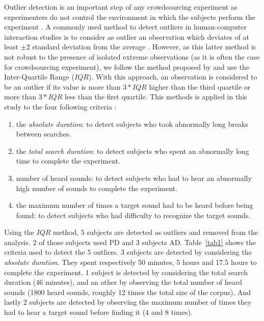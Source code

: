 \documentclass{aes2e}
\begin{document}
Outlier detection is an important step of any crowdsourcing experiment as experimenters do not control the environment in which the subjects perform the experiment \cite{komarov2013crowdsourcing,buchholz2011crowdsourcing}. A commonly used method to detect outliers in  human-computer interaction studies is to consider as outlier an observation  which deviates of at least $\pm2$ standard deviation from the average \cite{komarov2013crowdsourcing}. However, as this latter method is not robust to the presence of isolated extreme observations (as it is often the case for crowdsourcing experiment), we follow the  method proposed by \cite{komarov2013crowdsourcing} and use the Inter-Quartile Range ($IQR$). With this approach, an observation is considered to be an outlier if its value is more than $3*IQR$ higher than the third quartile or more than $3*IQR$ less than the first quartile. This methods is applied in this study to the four following criteria :

\begin{enumerate}
\item the \textit{absolute duration}: to detect subjects who took abnormally long breaks between searches.
\item the \textit{total search duration}: to detect subjects who spent an abnormally long time to complete the experiment.
\item number of heard sounds: to detect subjects who had to hear an abnormally high number of sounds to complete the experiment.
\item the maximum number of times a target sound had to be heard before being found: to detect subjects who had difficulty to recognize the target sounds.
\end{enumerate}

Using the $IQR$ method, 5 subjects are detected as outliers and removed from the analysis. 2 of those subjects used PD and 3 subjects AD. Table~\ref{tab1} shows the criteria used to detect the 5 outliers. 3 subjects are detected by considering the \textit{absolute duration}. They spent respectively 50 minutes, 5 hours and 17.5 hours to complete the experiment. 1 subject is detected by considering the total search duration (46 minutes), and an other by observing the total number of heard sounds (1800 heard sounds, roughly 12 times the total size of the corpus). And lastly 2 subjects are detected by observing the maximum number of times they had to hear a target sound before finding it (4 and 8 times).
\end{document}

